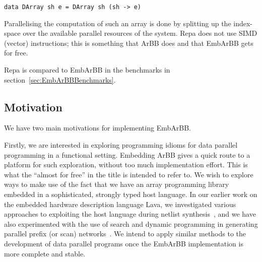 \begin{verbatim} 
data DArray sh e = DArray sh (sh -> e)  
\end{verbatim} 

Parallelising the computation of such an array is done by splitting up the 
index-space over the available parallel resources of the system. Repa does 
not use SIMD (vector) instructions; this is something that ArBB does and 
that EmbArBB gets for free. 

Repa is compared to EmbArBB in the benchmarks in section~\ref{sec:EmbArBBBenchmarks}.


\subsection{Motivation}

We have two main motivations for implementing EmbArBB.

Firstly, we are interested in exploring programming idioms for
data parallel programming in a functional setting. Embedding ArBB gives
a quick route to a platform for such exploration, without too much implementation effort. This is what the ``almost for free'' in the title is intended to refer to.
We wish to explore ways to make use of the fact that we have an array programming library embedded in a sophisticated, strongly typed host language. In our earlier work on the embedded hardware description language Lava, we investigated various approaches to exploiting the host language during netlist synthesis~\cite{LavaMultipliers}, and we have also experimented with the use of search and dynamic programming in generating parallel prefix (or scan) networks~\cite{SheeranJFP}. We intend to apply similar methods to the development of data parallel programs once the EmbArBB implementation is more complete and stable.




